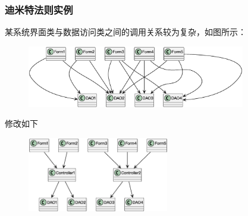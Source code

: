 \subsubsection{迪米特法则实例}
某系统界面类与数据访问类之间的调用关系较为复杂，如图所示：
\begin{figure}[H]
    \vspace{-0.5em}
	\centering
	\includegraphics[width=0.85\textwidth]{images/迪米特法则实例1.eps}
    \vspace{-1em}
\end{figure}

修改如下
\begin{figure}[H]
    \vspace{-0.5em}
	\centering
	\includegraphics[width=0.55\textwidth]{images/迪米特法则实例2.eps}
    \vspace{-1em}
\end{figure}